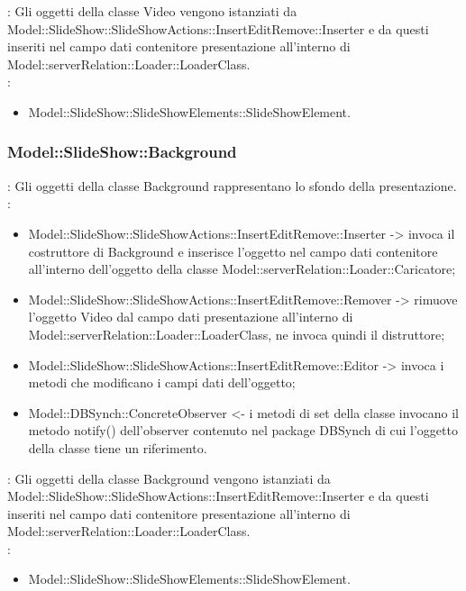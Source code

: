 {{\begin{itemize}
			\end{itemize}	
            \textbf{\interfacce}: Gli oggetti della classe Video vengono istanziati da Model::\-SlideShow::\-SlideShowActions::\-InsertEditRemove::\-Inserter e da questi inseriti nel campo dati contenitore presentazione all’interno di \\Model::\-serverRelation::\-Loader::\-LoaderClass.\\
            \textbf{\base}: 
                \begin{itemize}
                \item Model::\-SlideShow::\-SlideShowElements::\-SlideShowElement.
                \end{itemize}
                }     
             \subsubsection{Model::\-SlideShow::\-Background}{
            				\textbf{\tipo}: Gli oggetti della classe Background rappresentano lo sfondo della presentazione.\\
            				\textbf{\relaz}: 
            				\begin{itemize}
            					\item Model::\-SlideShow::\-SlideShowActions::\-InsertEditRemove::\-Inserter -> invoca il costruttore di Background e inserisce l’oggetto nel campo dati contenitore all’interno dell’oggetto della classe Model::\-serverRelation::\-Loader::\-Caricatore;
                                \item Model::\-SlideShow::\-SlideShowActions::\-InsertEditRemove::\-Remover -> rimuove l’oggetto Video dal campo dati presentazione all’interno di Model::\-serverRelation::\-Loader::\-LoaderClass, ne invoca quindi il distruttore;
                                \item Model::\-SlideShow::\-SlideShowActions::\-InsertEditRemove::\-Editor -> invoca i metodi che modificano i campi dati dell'oggetto;
                \item Model::\-DBSynch::\-ConcreteObserver <- i metodi di set della classe invocano il metodo notify() dell'observer contenuto nel package DBSynch di cui l'oggetto della classe tiene un riferimento.
            				\end{itemize}	
                            \textbf{\interfacce}: Gli oggetti della classe Background vengono istanziati da Model::\-SlideShow::\-SlideShowActions::\-InsertEditRemove::\-Inserter e da questi inseriti nel campo dati contenitore presentazione all’interno di\\ Model::\-serverRelation::\-Loader::\-LoaderClass.\\
                            \textbf{\base}: 
                                \begin{itemize}
                                \item Model::\-SlideShow::\-SlideShowElements::\-SlideShowElement.
                                \end{itemize}
                                }              
}


